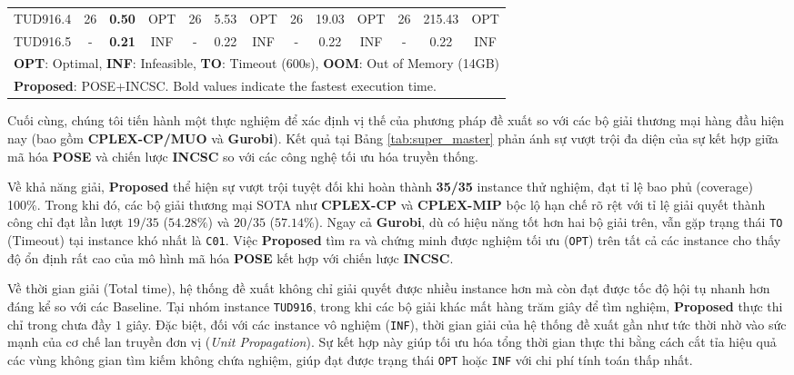 \documentclass[letterpaper,journal]{IEEEtran}
\begin{document}
\begin{table}[htbp]
{\begin{tabular}{l ccc ccc ccc ccc}
TUD916.4 & 26 & \textbf{0.50} & OPT & 26 & 5.53 & OPT & 26 & 19.03 & OPT & 26 & 215.43 & OPT \\
TUD916.5 & - & \textbf{0.21} & INF & - & 0.22 & INF & - & 0.22 & INF & - & 0.22 & INF \\
\bottomrule
\multicolumn{13}{l}{\footnotesize \textbf{OPT}: Optimal, \textbf{INF}: Infeasible, \textbf{TO}: Timeout (600s), \textbf{OOM}: Out of Memory (14GB)}\\
\multicolumn{13}{l}{\footnotesize \textbf{Proposed}: POSE+INCSC. Bold values indicate the fastest execution time.}
\end{tabular}%
}
\end{table}

Cuối cùng, chúng tôi tiến hành một thực nghiệm để xác định vị thế của phương pháp đề xuất so với các bộ giải thương mại hàng đầu hiện nay (bao gồm \textbf{CPLEX-CP/MUO} và \textbf{Gurobi}). Kết quả tại Bảng \ref{tab:super_master} phản ánh sự vượt trội đa diện của sự kết hợp giữa mã hóa \textbf{POSE} và chiến lược \textbf{INCSC} so với các công nghệ tối ưu hóa truyền thống.

Về khả năng giải, \textbf{Proposed} thể hiện sự vượt trội tuyệt đối khi hoàn thành \textbf{35/35} instance thử nghiệm, đạt tỉ lệ bao phủ (coverage) 100\%. Trong khi đó, các bộ giải thương mại SOTA như \textbf{CPLEX-CP} và \textbf{CPLEX-MIP} bộc lộ hạn chế rõ rệt với tỉ lệ giải quyết thành công chỉ đạt lần lượt $19/35$ ($54.28\%$) và $20/35$ ($57.14\%$). Ngay cả \textbf{Gurobi}, dù có hiệu năng tốt hơn hai bộ giải trên, vẫn gặp trạng thái \texttt{TO} (Timeout) tại instance khó nhất là \texttt{C01}. Việc \textbf{Proposed} tìm ra và chứng minh được nghiệm tối ưu (\texttt{OPT}) trên tất cả các instance cho thấy độ ổn định rất cao của mô hình mã hóa \textbf{POSE} kết hợp với chiến lược \textbf{INCSC}.

Về thời gian giải (Total time), hệ thống đề xuất không chỉ giải quyết được nhiều instance hơn mà còn đạt được tốc độ hội tụ nhanh hơn đáng kể so với các Baseline. Tại nhóm instance \texttt{TUD916}, trong khi các bộ giải khác mất hàng trăm giây để tìm nghiệm, \textbf{Proposed} thực thi chỉ trong chưa đầy $1$ giây. Đặc biệt, đối với các instance vô nghiệm (\texttt{INF}), thời gian giải của hệ thống đề xuất gần như tức thời nhờ vào sức mạnh của cơ chế lan truyền đơn vị (\textit{Unit Propagation}). Sự kết hợp này giúp tối ưu hóa tổng thời gian thực thi bằng cách cắt tỉa hiệu quả các vùng không gian tìm kiếm không chứa nghiệm, giúp đạt được trạng thái \texttt{OPT} hoặc \texttt{INF} với chi phí tính toán thấp nhất.
\end{document}
